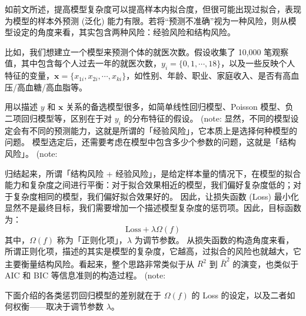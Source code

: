 如前文所述，提高模型复杂度可以提高样本内拟合度，但很可能出现过拟合，表现为模型的样本外预测 (泛化) 能力有限。若将“预测不准确”视为一种风险，则从模型设定的角度来看，其实包含两种风险：经验风险和结构风险。

比如，我们想建立一个模型来预测个体的就医次数。假设收集了 10,000 笔观察值，其中包含每个人过去一年的就医次数，$y_i = \{0,1,\cdots,18\}$，以及一些反映个人特征的变量，$\mathbf{x} = \{x_{1i},x_{2i},\cdots,x_{ki}\}$，如性别、年龄、职业、家庭收入、是否有高血压/高血糖/高血脂等。

用以描述 $y$ 和 $\mathbf{x}$ 关系的备选模型很多，如简单线性回归模型、Poisson 模型、负二项回归模型等，区别在于对 $y_i$ 的分布特征的假设。 (note: %
显然，不同的模型设定会有不同的预测能力，这就是所谓的「经验风险」，它本质上是选择何种模型的问题。
模型选定后，还需要考虑在模型中包含多少个参数的问题，这就是「结构风险」。 (note: %

归结起来，所谓「结构风险 + 经验风险」，是给定样本量的情况下，在模型的拟合能力和复杂度之间进行平衡：对于拟合效果相近的模型，我们偏好复杂度低的；对于复杂度相同的模型，我们偏好拟合效果好的。
因此，让损失函数 (Loss) 最小化显然不是最终目标，我们需要增加一个描述模型复杂度的惩罚项。因此，目标函数为：
\begin{equation}\label{eq:Lasso-08}
	\text{Loss}+\lambda \Omega(f)
\end{equation}
其中，$\Omega(f)$ 称为「正则化项」，$\lambda$ 为调节参数。
从损失函数的构造角度来看，所谓正则化项，描述的其实是模型的复杂度，它越高，过拟合的风险也就越大，它主要衡量结构风险。看起来，整个思路非常类似于从 $R^2$ 到 $\bar{R}^2$ 的演变，也类似于 AIC 和 BIC 等信息准则的构造过程。 (note: %

下面介绍的各类惩罚回归模型的差别就在于 $\Omega(f)$ 的 Loss 的设定，以及二者如何权衡——取决于调节参数 $\lambda$。


